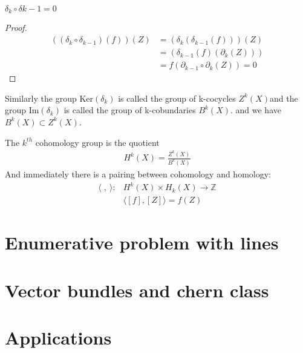 \documentclass{article}
\begin{document}
\begin{lm}
    $\delta_{k}\circ \delta{k-1} = 0$
\end{lm}

\begin{proof}
    \begin{align*}
        ((\delta_{k}\circ \delta_{k-1})(f))(Z) &= (\delta_{k}(\delta_{k-1}(f)))(Z) \\
                                               &= (\delta_{k-1}(f)(\partial_{k}(Z)))\\
                                               &= f(\partial_{k-1}\circ \partial_{k}(Z) )= 0
    \end{align*}
    
\end{proof}
Similarly the group Ker$(\delta_{k})$ is called the group of k-cocycles $Z^{k}(X)$and the 
group Im$(\delta_{k})$ is called the group of k-cobundaries $B^{k}(X)$. and we have $B^{k}(X) \subset Z^{k}(X)$.

\begin{df}
    The $k^{th}$ cohomology group is the quotient 
    \begin{align*}
        H^{k}(X) = \frac{Z^{k}(X)}{B^{k}(X)}
    \end{align*}  
    And immediately there is a pairing between cohomology and homology:
    \begin{align*}
        \langle \; ,\ \rangle : & H^{k}(X)\times H_{k}(X) \rightarrow \mathbb{Z} \\
                                & \langle [f],[Z] \rangle = f(Z)         
    \end{align*}  

\end{df}


\newpage
\section{Enumerative problem with lines}
\newpage
\section{Vector bundles and chern class}

\newpage
\section{Applications}
\end{document}
